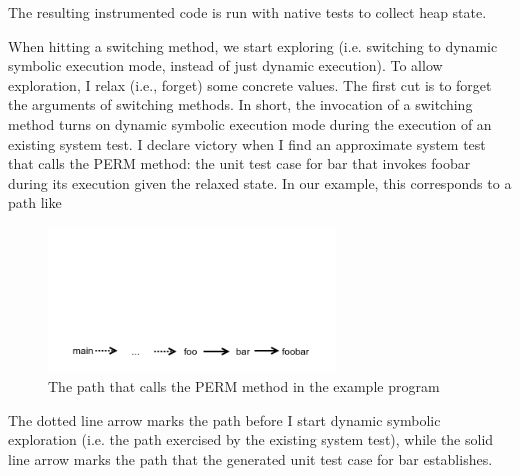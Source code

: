 The resulting instrumented code is run with native tests to collect heap state.

  When hitting a switching method, we start exploring (i.e. switching to dynamic symbolic execution mode, instead of just dynamic execution).  To allow exploration, I relax (i.e., forget) some concrete values.  The first cut is to forget the arguments of switching methods.  In short, the invocation of a switching method turns on dynamic symbolic execution mode during the execution of an existing system test.  I declare victory when I find an approximate system test that calls the PERM method: the unit test case for bar that invokes foobar during its execution given the relaxed state.  In our example, this corresponds to a path like 

\begin{figure}[h]
\centering
\includegraphics[width=3in, trim=0in 0in 0in 2.0in, clip]{path.png}
\caption{The path that calls the PERM method in the example program}
\end{figure}

The dotted line arrow marks the path before I start dynamic symbolic exploration (i.e. the path exercised by the existing system test), while the solid line arrow marks the path that the generated unit test case for bar establishes. 

